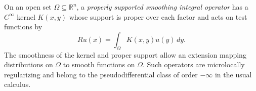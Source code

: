 
On an open set $\Omega\subseteq\mathbb R^n$, a \emph{properly supported smoothing integral operator} has a $C^\infty$ kernel $K(x,y)$ whose support is proper over each factor and acts on test functions by
\[
Ru(x)=\int_\Omega K(x,y)u(y)\,dy.
\]
The smoothness of the kernel and proper support allow an extension mapping distributions on $\Omega$ to smooth functions on $\Omega$. Such operators are microlocally regularizing and belong to the pseudodifferential class of order $-\infty$ in the usual calculus.

